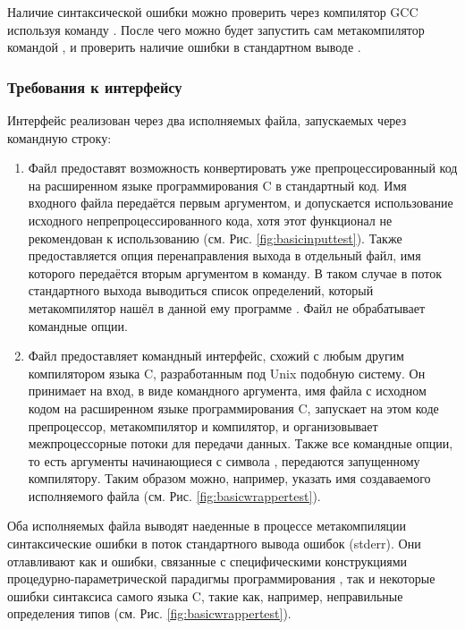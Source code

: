 Наличие синтаксической ошибки можно проверить через компилятор GCC используя команду .
После чего можно будет запустить сам метакомпилятор командой ,
и проверить наличие ошибки в стандартном выводе .

\subsubsection{Требования к интерфейсу}
Интерфейс реализован через два исполняемых файла, запускаемых через командную строку:
\begin{enumerate}
  \item Файл  предоставят возможность конвертировать уже препроцессированный код на расширенном языке программирования C в стандартный код.
  Имя входного файла передаётся первым аргументом, и допускается использование исходного непрепроцессированного кода, хотя этот функционал не рекомендован к использованию (см. Рис. \ref{fig:basicinputtest}).
  Также предоставляется опция перенаправления выхода в отдельный файл, имя которого передаётся вторым аргументом в команду.
  В таком случае в поток стандартного выхода выводиться список определений, который метакомпилятор нашёл в данной ему программе . Файл  не обрабатывает командные опции.

  \item Файл  предоставляет командный интерфейс, схожий с любым другим компилятором языка C, разработанным под Unix подобную систему.
  Он принимает на вход, в виде командного аргумента, имя файла с исходном кодом на расширенном языке программирования C, запускает на этом коде препроцессор, метакомпилятор и компилятор, и организовывает межпроцессорные потоки для передачи данных.
  Также все командные опции, то есть аргументы начинающиеся с символа \cmd{-}, передаются запущенному компилятору.
  Таким образом можно, например, указать имя создаваемого исполняемого файла (см. Рис. \ref{fig:basicwrappertest}).
\end{enumerate}

Оба исполняемых файла выводят наеденные в процессе метакомпиляции синтаксические ошибки в поток стандартного вывода ошибок (stderr).
Они отлавливают как и ошибки, связанные с специфическими конструкциями процедурно-параметрической парадигмы программирования
,
так и некоторые ошибки синтаксиса самого языка C, такие как, например, неправильные определения типов (см. Рис. \ref{fig:basicwrappertest}).

